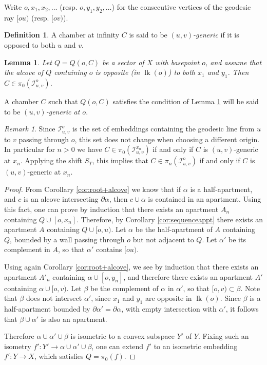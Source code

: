 \documentclass[a4paper, 11pt]{article}
\theoremstyle{plain}
\newtheorem{lemma}[proposition]{Lemma}
\theoremstyle{definition}
\newtheorem{definition}[proposition]{Definition}
\theoremstyle{remark}
\newtheorem{remark}[proposition]{Remark}
\DeclareMathOperator{\lk}{lk}
\newcommand{\IR}{\mathcal I}
\begin{document}
Write $o,x_1,x_2,\dots$ (resp. $o,y_1,y_2,\dots$) for the consecutive vertices of the geodesic ray $[ou)$ (resp. $[ov)$).

\begin{definition}
A chamber at infinity $C$ is said to be \emph{$(u,v)$-generic} if it is opposed to both $u$ and $v$.
\end{definition}

\begin{lemma}\label{lem:sectorpi0}
Let $Q=Q(o,C)$ be a sector of $X$ with basepoint $o$, and assume that the alcove of $Q$ containing $o$ is opposite (in $\lk(o)$) to both $x_1$ and $y_1$. Then $C\in \pi_0(\IR_{u,v}^o)$.
\end{lemma}

A chamber $C$ such that $Q(o,C)$ satisfies the condition of Lemma \ref{lem:sectorpi0} will be said to be \emph{$(u,v)$-generic at $o$}.

\begin{remark}
    Since $\IR_{u,v}^o$ is the set of embeddings containing the geodesic line from $u$ to $v$ passing through $o$, this set does not change when choosing a different origin. In particular for $n>0$ we have $C\in\pi_0 (\IR_{u,v}^{x_n})$ if and only if $C$  is $(u,v)$-generic at $x_n$. Applying the shift $S_\Upsilon$, this implies that $C\in \pi_n(\IR_{u,v}^o)$ if and only if $C$ is $(u,v)$-generic at $x_n$.
\end{remark}

\begin{proof}
From Corollary \ref{cor:root+alcove} we know that if $\alpha$ is a half-apartment, and $c$ is an alcove intersecting $\partial\alpha$, then $c\cup \alpha$ is contained in an apartment. Using this fact, one can prove by induction that there exists an apartment $A_n$ containing $Q\cup [o,x_n]$. Therefore, by Corollary \ref{cor:sequenceappt} there exists an apartment $A$ containing $Q\cup [o,u)$.  Let $\alpha$ be the half-apartment of $A$ containing $Q$, bounded by a wall passing through $o$ but not adjacent to $Q$. Let $\alpha'$ be its complement in $A$, so that $\alpha'$ contains $[ou)$. 

Using again Corollary \ref{cor:root+alcove}, we see by induction that there exists an apartment $A'_n$ containing $\alpha\cup [o,y_n]$, and therefore there exists an apartment $A'$ containing $\alpha\cup [o,v)$. Let $\beta$ be the complement of $\alpha$ in $\alpha'$, so that $[o,v)\subset \beta$. Note that $\beta$ does not intersect $\alpha'$, since $x_1$ and $y_1$ are opposite in $\lk(o)$.
Since $\beta$ is a half-apartment bounded by $\partial \alpha'=\partial \alpha$, with empty intersection with $ \alpha'$, it follows that $\beta\cup \alpha'$ is also an apartment. 

Therefore $\alpha\cup \alpha'\cup \beta$ is isometric to a convex subspace $Y'$ of $Y$. Fixing such an isometry $f':Y'\to \alpha\cup \alpha'\cup \beta$, one can extend $f'$ to an isometric embedding $f':Y\to X$, which satisfies $Q=\pi_0(f)$.

\end{proof}
\end{document}
